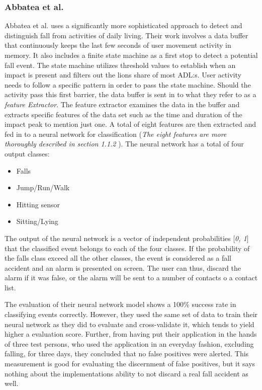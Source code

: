 \documentclass[12pt, a4paper, onecolumn]{article}
\begin{document}
	
	\subsubsection{Abbatea et al.}
	Abbatea et al. uses a significantly more sophisticated approach to detect and distinguish fall from activities of daily living. Their work involves a data buffer that continuously keeps the last few seconds of user movement activity in memory. It also includes a finite state machine as a first stop to detect a potential fall event. The state machine utilizes threshold values to establish when an impact is present and filters out the lions share of most ADL:s. User activity needs to follow a specific pattern in order to pass the state machine. Should the activity pass this first barrier, the data buffer is sent in to what they refer to as a \textit{feature Extractor}. The feature extractor examines the data in the buffer and extracts specific features of the data set such as the time and duration of the impact peak to mention just one. A total of eight features are then extracted and fed in to a neural network for classification  (\textit{The eight features are more thoroughly described in section 1.1.2 }). The neural network has a total of four output classes:

	\begin{itemize}
		\item Falls
		\item Jump/Run/Walk
		\item Hitting sensor
		\item Sitting/Lying
	\end{itemize}

	The output of the neural network is a vector of independent probabilities [\textit{0, 1}] that the classified event belongs to each of the four classes. If the probability of the falls class exceed all the other classes, the event is considered as a fall accident and an alarm is presented on screen. The user can thus, discard the alarm if it was false, or the alarm will be sent to a number of contacts o a contact list. 

	The evaluation of their neural network model shows a 100\% success rate in classifying events correctly. However, they used the same set of data to train their neural network as they did to evaluate and cross-validate it, which tends to yield higher a evaluation score. Further, from having put their application in the hands of three test persons, who used the application in an everyday fashion, excluding falling, for three days, they concluded that no false positives were alerted. This measurement is good for evaluating the discernment of false positives, but it says nothing about the implementations ability to not discard a real fall accident as well. 
	
\end{document}
